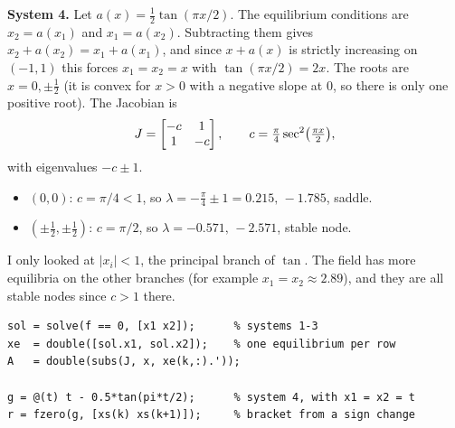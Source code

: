 \textbf{System 4.} Let $a(x)=\tfrac12\tan(\pi x/2)$. The equilibrium conditions are $x_2=a(x_1)$ and $x_1=a(x_2)$. Subtracting them gives $x_2+a(x_2)=x_1+a(x_1)$, and since $x+a(x)$ is strictly increasing on $(-1,1)$ this forces $x_1=x_2=x$ with $\tan(\pi x/2)=2x$. The roots are $x=0,\pm\tfrac12$ (it is convex for $x>0$ with a negative slope at $0$, so there is only one positive root). The Jacobian is
\[
J=\begin{bmatrix}-c&1\\1&-c\end{bmatrix},\qquad c=\tfrac{\pi}{4}\sec^2\!\big(\tfrac{\pi x}{2}\big),
\]
with eigenvalues $-c\pm1$.
\begin{itemize}
\item $(0,0)$: $c=\pi/4<1$, so $\lambda=-\tfrac\pi4\pm1=0.215,\,-1.785$, saddle.
\item $(\pm\tfrac12,\pm\tfrac12)$: $c=\pi/2$, so $\lambda=-0.571,\,-2.571$, stable node.
\end{itemize}
I only looked at $|x_i|<1$, the principal branch of $\tan$. The field has more equilibria on the other branches (for example $x_1=x_2\approx2.89$), and they are all stable nodes since $c>1$ there.

\begin{lstlisting}
sol = solve(f == 0, [x1 x2]);      % systems 1-3
xe  = double([sol.x1, sol.x2]);    % one equilibrium per row
A   = double(subs(J, x, xe(k,:).'));

g = @(t) t - 0.5*tan(pi*t/2);      % system 4, with x1 = x2 = t
r = fzero(g, [xs(k) xs(k+1)]);     % bracket from a sign change
\end{lstlisting}
